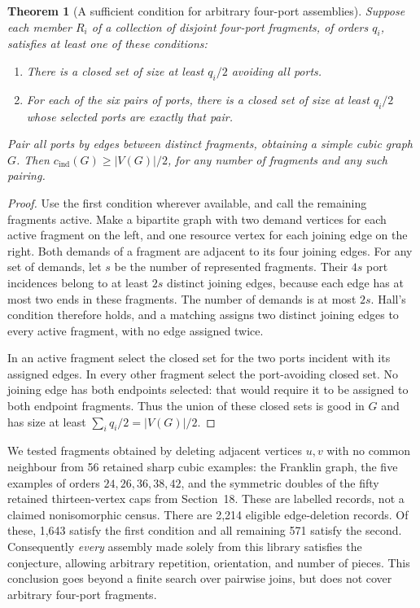 \documentclass[11pt]{article}
\newtheorem{theorem}{Theorem}[section]
\newcommand{\cind}{c_{\mathrm{ind}}}
\begin{document}
\begin{theorem}[A sufficient condition for arbitrary four-port assemblies]
\label{thm:four-port-assembly}
Suppose each member $R_i$ of a collection of disjoint four-port
fragments, of orders $q_i$, satisfies at least one of these conditions:
\begin{enumerate}
\item There is a closed set of size at least $q_i/2$ avoiding all ports.
\item For each of the six pairs of ports, there is a closed set of size
at least $q_i/2$ whose selected ports are exactly that pair.
\end{enumerate}
Pair all ports by edges between distinct fragments, obtaining a simple
cubic graph $G$. Then $\cind(G)\geq |V(G)|/2$, for any number of
fragments and any such pairing.
\end{theorem}
\begin{proof}
Use the first condition wherever available, and call the remaining
fragments active. Make a bipartite graph with two demand vertices for
each active fragment on the left, and one resource vertex for each
joining edge on the right. Both demands of a fragment are adjacent
to its four joining edges. For any set of demands, let $s$ be the
number of represented fragments. Their $4s$ port incidences belong
to at least $2s$ distinct joining edges, because each edge has at most
two ends in these fragments. The number of demands is at most $2s$.
Hall's condition therefore holds, and a matching assigns two distinct
joining edges to every active fragment, with no edge assigned twice.

In an active fragment select the closed set for the two ports incident
with its assigned edges. In every other fragment select the
port-avoiding closed set. No joining edge has both endpoints selected:
that would require it to be assigned to both endpoint fragments.
Thus the union of these closed sets is good in $G$ and has size at
least $\sum_iq_i/2=|V(G)|/2$.
\end{proof}

We tested fragments obtained by deleting adjacent vertices $u,v$ with
no common neighbour from 56 retained sharp cubic examples: the Franklin
graph, the five examples of orders $24,26,36,38,42$, and the symmetric
doubles of the fifty retained thirteen-vertex caps from Section~18.
These are labelled records, not a claimed nonisomorphic census.
There are 2,214 eligible edge-deletion records. Of these, 1,643 satisfy
the first condition and all remaining 571 satisfy the second.
Consequently \emph{every} assembly made solely from this library
satisfies the conjecture, allowing arbitrary repetition, orientation,
and number of pieces. This conclusion goes beyond a finite search
over pairwise joins, but does not cover arbitrary four-port fragments.
\end{document}
